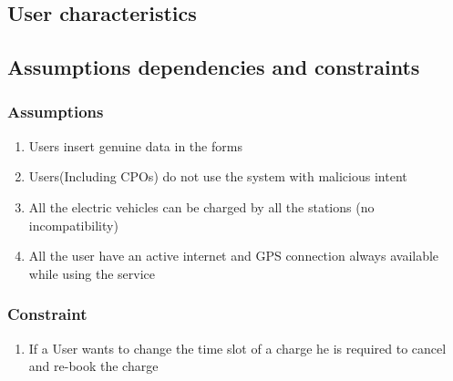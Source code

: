 \subsection{User characteristics}

\subsection{Assumptions dependencies and constraints}
\subsubsection{Assumptions}
\begin{enumerate}[label=DA\arabic*]
      \item Users insert genuine data in the forms
      \item Users(Including CPOs) do not use the system with malicious intent
      \item All the electric vehicles can be charged by all the stations (no incompatibility)
      \item All the user have an active internet and GPS connection always available while using the service
\end{enumerate}
\subsubsection{Constraint}
\begin{enumerate}[label=C\arabic*]
      \item If a User wants to change the time slot of a charge he is required to cancel and re-book the charge
\end{enumerate}

\clearpage